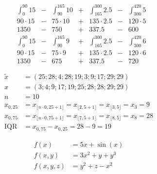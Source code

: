 \documentclass[
	final,
	a4paper,
	oneside,
	parskip=full,
	headings=standardclasses,
	headings=big,
	pointednumbers
]{scrartcl}
\begin{document}
	
    
    \begin{align*}
        & \int_{0}^{90} 15 &-& \int_{90}^{165} 10 &+& \int_{165}^{300} 2.5 &-& \int_{300}^{420} 5 \\
        & 90 \cdot 15      &-& 75 \cdot 10        &+& 135 \cdot 2.5        &-& 120 \cdot 5 \\
        & 1350             &-& 750                &+& 337.5                &-& 600 \\
        & \int_{0}^{90} 15 &-& \int_{90}^{165} 9  &+& \int_{165}^{300} 2.5 &-& \int_{300}^{420} 6 \\
        & 90 \cdot 15      &-& 75 \cdot 9         &+& 135 \cdot 2.5        &-& 120 \cdot 6 \\
        & 1350             &-& 675                &+& 337.5                &-& 720 
    \end{align*}

    \begin{align*}
        \tilde x            &= (25; 28; 4; 28; 19; 3; 9; 17; 29; 29) \\
        x                   &= (3;4;9;17;19;25;28;28;29;29) \\
        n                   &= 10 \\ 
        x_{0{,}25}          &= x_{\lfloor n \cdot 0{,}25 + 1\rfloor}
                             = x_{\lfloor 2{,}5 + 1\rfloor}
                             = x_{\lfloor 3{,}5\rfloor}
                             = x_3 = 9 \\
        x_{0{,}75}          &= x_{\lfloor n \cdot 0{,}75 +1\rfloor}
                             = x_{\lfloor 7{,}5 +1\rfloor}
                             = x_{\lfloor 8{,}5\rfloor}
                             = x_8 = 28 \\
        \operatorname{IQR}  &= x_{0{,}75} - x_{0{,}25}
                             = 28-9 = 19
    \end{align*}

    \begin{align*}
        f(x)     &= 5x + \sin(x) \\
        f(x,y)   &= 3x^2+y+y^3 \\
        f(x,y,z) &= y^{2}+z-x^{2}
    \end{align*}
	
\end{document}
